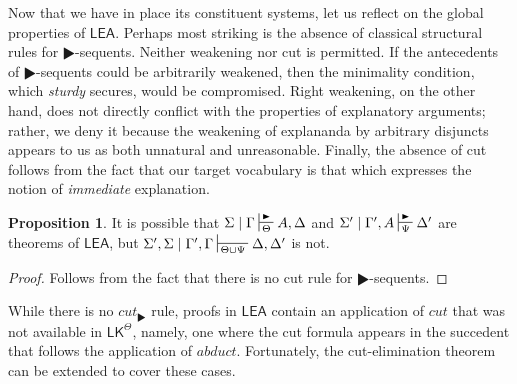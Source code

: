 \documentclass{article}
\theoremstyle{definition}
\theoremstyle{definition}
\theoremstyle{definition}
\theoremstyle{definition}
\theoremstyle{remark}
\theoremstyle{definition}
\newtheorem{proposition}{Proposition}
\theoremstyle{definition}
\begin{document}
Now that we have in place its constituent systems, let us reflect on the global properties of  $ \mathsf{LEA}$. Perhaps most striking is the absence of classical structural rules for $ \RHD$-sequents. Neither weakening nor cut is permitted. If the antecedents of $ \RHD $-sequents could be arbitrarily weakened, then the minimality condition, which \textit{sturdy} secures, would be compromised. Right weakening, on the other hand, does not directly conflict with the properties of explanatory arguments; rather, we deny it because the weakening of explananda by arbitrary disjuncts appears to us as both unnatural and unreasonable. Finally, the absence of cut follows from the fact that our target vocabulary is that which expresses the notion of \textit{immediate} explanation.

\begin{proposition}\label{nontrans}
	It is possible that $ \Sigma\mid\Gamma\sststile{\Theta}{\RHD} A, \Delta $ and $ \Sigma'\mid\Gamma', A\sststile{\Psi}{\RHD} \Delta' $ are theorems of $ \mathsf{LEA}$, but $ \Sigma',\Sigma\mid\Gamma',\Gamma\sststile{\Theta\cup\Psi}{}\Delta,\Delta' $ is not.
	
	\begin{proof}
		Follows from the fact that there is no cut rule for $ \RHD$-sequents.
	\end{proof}
	
\end{proposition}


While there is no $ cut_\RHD$ rule, proofs in $ \mathsf{LEA}$ contain an application of $cut $ that was not available in $\mathsf{LK}^\Theta$, namely, one where the cut formula appears in the succedent that follows the application of $ abduct $.  Fortunately, the cut-elimination theorem can be extended to cover these cases.
\end{document}
